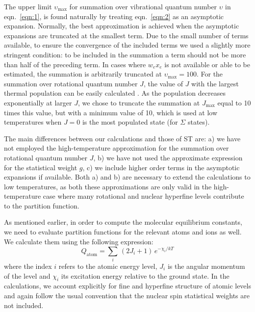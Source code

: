 \documentclass[traditabstract]{aa} %
\begin{document}
The upper limit $\upsilon_\mathrm{max}$ for summation over vibrational quantum number $\upsilon$ in eqn.~\ref{eqn:1}, is found naturally by treating eqn.~\ref{eqn:2} as an asymptotic expansion.  Normally, the best approximation is achieved when the asymptotic expansions are truncated at the smallest term.   Due to the small number of terms available, to ensure the convergence of the included terms we used a slightly more stringent condition: to be included in the summation a term should not be more than half of the preceding term.  In cases where $w_e x_e$ is not available or able to be estimated, the summation is arbitrarily truncated at $\upsilon_\mathrm{max}=100$.  For the summation over rotational quantum number $J$, the value of $J$ with the largest thermal population can be easily calculated \citep[see pg. 124 of][]{1950msms.book.....H}.  As the population decreases exponentially at larger $J$, we chose to truncate the summation at $J_\mathrm{max}$ equal to 10 times this value, but with a minimum value of 10, which is used at low temperatures when $J=0$ is the most populated state (for $\Sigma$ states).

The main differences between our calculations and those of ST are: a) we have not employed the high-temperature approximation for the summation over rotational quantum number $J$, b) we have not used the approximate expression for the statistical weight $g$, c) we include higher order terms in the asymptotic expansions if available.  Both a) and b) are necessary to extend the calculations to low temperatures, as both these approximations are only valid in the high-temperature case where many rotational and nuclear hyperfine levels contribute to the partition function.

As mentioned earlier, in order to compute the molecular equilibrium constants, we need to evaluate partition functions for the relevant atoms and ions as well.  We calculate them using the following expression:
\begin{equation}
Q_\mathrm{atom} = \sum_i\,\left(2J_i+1\right)\,e^{-\chi_i/kT}
\label{eq:qatom}
\end{equation}
where the index $i$ refers to the atomic energy level, $J_i$ is the angular momentum of the level and $\chi_i$ its excitation energy relative to the ground state. 
In the calculations, we account explicitly for fine and hyperfine structure of atomic levels and again follow the usual convention that the nuclear spin statistical weights are not included.  
\end{document}
